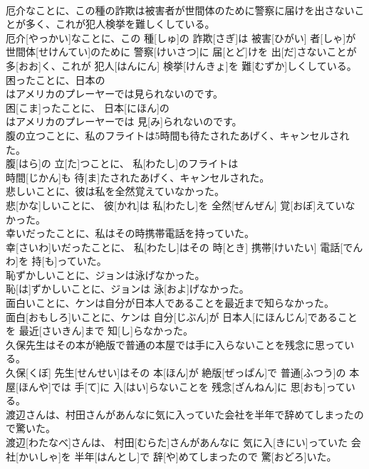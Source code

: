 \documentclass[8pt]{extreport}
\begin{document}
\begin{CJK}{UTF8}{min}
\\	厄介なことに、この種の詐欺は被害者が世間体のために警察に届けを出さないことが多く、これが犯人検挙を難しくしている。	
\\	厄介[やっかい]なことに、この 種[しゅ]の 詐欺[さぎ]は 被害[ひがい] 者[しゃ]が 世間体[せけんてい]のために 警察[けいさつ]に 届[とど]けを 出[だ]さないことが 多[おお]く、これが 犯人[はんにん] 検挙[けんきょ]を 難[むずか]しくしている。
\\	困ったことに、日本の
\\	はアメリカのプレーヤーでは見られないのです。	
\\	困[こま]ったことに、 日本[にほん]の 
\\	はアメリカのプレーヤーでは 見[み]られないのです。
\\	腹の立つことに、私のフライトは5時間も待たされたあげく、キャンセルされた。	
\\	腹[はら]の 立[た]つことに、 私[わたし]のフライトは 
\\	時間[じかん]も 待[ま]たされたあげく、キャンセルされた。
\\	悲しいことに、彼は私を全然覚えていなかった。	
\\	悲[かな]しいことに、 彼[かれ]は 私[わたし]を 全然[ぜんぜん] 覚[おぼ]えていなかった。
\\	幸いだったことに、私はその時携帯電話を持っていた。	
\\	幸[さいわ]いだったことに、 私[わたし]はその 時[とき] 携帯[けいたい] 電話[でんわ]を 持[も]っていた。
\\	恥ずかしいことに、ジョンは泳げなかった。	
\\	恥[は]ずかしいことに、ジョンは 泳[およ]げなかった。
\\	面白いことに、ケンは自分が日本人であることを最近まで知らなかった。	
\\	面白[おもしろ]いことに、ケンは 自分[じぶん]が 日本人[にほんじん]であることを 最近[さいきん]まで 知[し]らなかった。
\\	久保先生はその本が絶版で普通の本屋では手に入らないことを残念に思っている。	
\\	久保[くぼ] 先生[せんせい]はその 本[ほん]が 絶版[ぜっぱん]で 普通[ふつう]の 本屋[ほんや]では 手[て]に 入[はい]らないことを 残念[ざんねん]に 思[おも]っている。
\\	渡辺さんは、村田さんがあんなに気に入っていた会社を半年で辞めてしまったので驚いた。	
\\	渡辺[わたなべ]さんは、 村田[むらた]さんがあんなに 気に入[きにい]っていた 会社[かいしゃ]を 半年[はんとし]で 辞[や]めてしまったので 驚[おどろ]いた。

\end{CJK}
\end{document}
